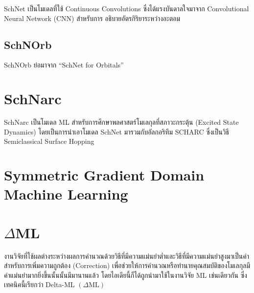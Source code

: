 SchNet เป็นโมเดลที่ใช้ Continuous Convolutions ซึ่งได้แรงบันดาลใจมาจาก Convolutional Neural Network (CNN) สำหรับการ%
อธิบายอัตรกิริยาระหว่างอะตอม\autocite{schutt2017,schutt2018}

\subsection{SchNOrb}
\label{ssec:schnorb}

SchNOrb ย่อมาจาก \enquote{SchNet for Orbitals}\autocite{schutt2019a}

\section{SchNarc}
\label{sec:schnarc}

SchNarc เป็นโมเดล ML สำหรับการศึกษาพลศาสตร์โมเลกุลที่สภาวะกระตุ้น (Excited State Dynamics)\autocite{westermayr2020} 
โดยเป็นการนำเอาโมเดล SchNet\autocite{schutt2017,schutt2018} มารวมกับอัลกอริทึม SCHARC\autocite{richter2011,mai2018} 
ซึ่งเป็นวิธี Semiclassical Surface Hopping

\section{Symmetric Gradient Domain Machine Learning}
\label{sec:sgdml}

\autocite{chmiela2017}

\autocite{chmiela2018}

\autocite{sauceda2020}

\autocite{chmiela2020}

\autocite{chmiela2022}

\section{\texorpdfstring{$\Delta$}-ML}
\label{sec:delta_ML}

งานวิจัยที่ใช้ผลต่างระหว่างผลการคำนวณด้วยวิธีที่มีความแม่นยำต่ำและวิธีที่มีความแม่นยำสูงมาเป็นค่าสำหรับการเพิ่มความถูกต้อง (Correction) 
เพื่อช่วยให้การคำนวณหรือทำนายคุณสมบัติของโมเลกุลมีค่าแม่นยำมากยิ่งขึ้นนั้นนั้นมีมานานแล้ว\autocite{hu2003,wu2007,balabin2009} 
โดยไอเดียนี้ก็ได้ถูกนำมาใช้ในงานวิจัย ML เช่นเดียวกัน ซึ่งเทคนิคนี้เรียกว่า Delta-ML $(\Delta\text{ML})$

